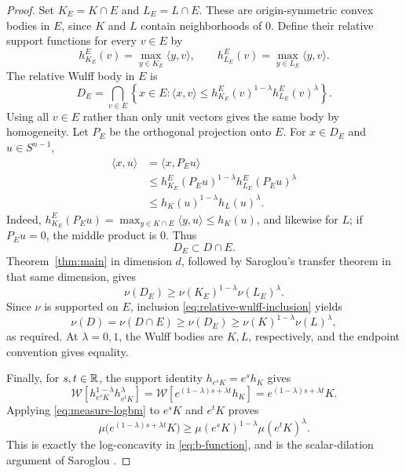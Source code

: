 \begin{proof}
Set $K_E=K\cap E$ and $L_E=L\cap E$. These are origin-symmetric convex
bodies in $E$, since $K$ and $L$ contain neighborhoods of $0$. Define
their relative support functions for every $v\in E$ by
\[
 h^E_{K_E}(v)=\max_{y\in K_E}\langle y,v\rangle,
 \qquad
 h^E_{L_E}(v)=\max_{y\in L_E}\langle y,v\rangle.
\]
The relative Wulff body in $E$ is
\[
 D_E=\bigcap_{v\in E}
 \left\{x\in E:\langle x,v\rangle
 \le h^E_{K_E}(v)^{1-\lambda}h^E_{L_E}(v)^\lambda\right\}.
\]
Using all $v\in E$ rather than only unit vectors gives the same body by
homogeneity. Let $P_E$ be the orthogonal projection onto $E$. For
$x\in D_E$ and $u\in S^{n-1}$,
\begin{align*}
 \langle x,u\rangle
 &=\langle x,P_Eu\rangle\\
 &\le h^E_{K_E}(P_Eu)^{1-\lambda}
       h^E_{L_E}(P_Eu)^\lambda\\
 &\le h_K(u)^{1-\lambda}h_L(u)^\lambda.
\end{align*}
Indeed, $h^E_{K_E}(P_Eu)=\max_{y\in K\cap E}\langle y,u\rangle\le h_K(u)$,
and likewise for $L$; if $P_Eu=0$, the middle product is $0$.
Thus
\begin{equation}\label{eq:relative-wulff-inclusion}
 D_E\subset D\cap E.
\end{equation}
Theorem~\ref{thm:main} in dimension $d$, followed by Saroglou's transfer
theorem \cite[Theorem~3.1]{Saroglou2016} in that same dimension, gives
\[
 \nu(D_E)\ge \nu(K_E)^{1-\lambda}\nu(L_E)^\lambda.
\]
Since $\nu$ is supported on $E$, inclusion
\eqref{eq:relative-wulff-inclusion} yields
\[
 \nu(D)=\nu(D\cap E)\ge\nu(D_E)
 \ge\nu(K)^{1-\lambda}\nu(L)^\lambda,
\]
as required. At $\lambda=0,1$, the Wulff bodies are $K,L$, respectively,
and the endpoint convention gives equality.

Finally, for $s,t\in\mathbb R$, the support identity $h_{e^sK}=e^s h_K$ gives
\[
 \mathcal W\!\left[h_{e^sK}^{1-\lambda}h_{e^tK}^\lambda\right]
 =\mathcal W\!\left[e^{(1-\lambda)s+\lambda t}h_K\right]
 =e^{(1-\lambda)s+\lambda t}K.
\]
Applying \eqref{eq:measure-logbm} to $e^sK$ and $e^tK$ proves
\[
 \mu\bigl(e^{(1-\lambda)s+\lambda t}K\bigr)
 \ge \mu(e^sK)^{1-\lambda}\mu(e^tK)^\lambda.
\]
This is exactly the log-concavity in \eqref{eq:b-function}, and is the
scalar-dilation argument of Saroglou \cite[Corollary~3.2]{Saroglou2016}.
\end{proof}
